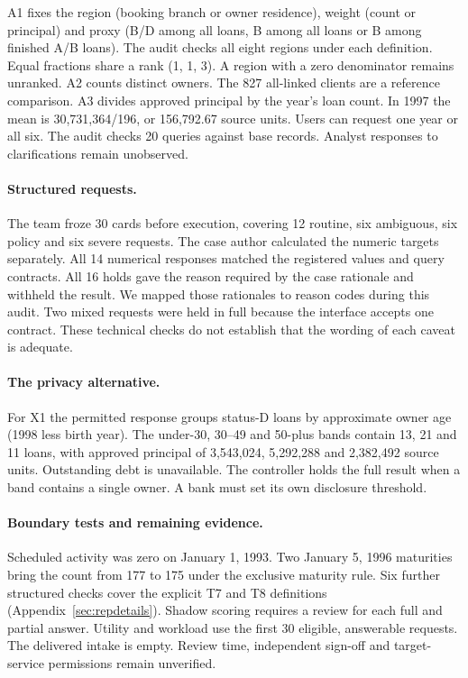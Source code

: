 A1 fixes the region (booking branch or owner residence), weight (count or principal) and proxy (B/D among all loans, B among all loans or B among finished A/B loans). The audit checks all eight regions under each definition. Equal fractions share a rank (1, 1, 3). A region with a zero denominator remains unranked. A2 counts distinct owners. The 827 all-linked clients are a reference comparison. A3 divides approved principal by the year's loan count. In 1997 the mean is 30,731,364/196, or 156,792.67 source units. Users can request one year or all six. The audit checks 20 queries against base records. Analyst responses to clarifications remain unobserved.

\paragraph{Structured requests.}
The team froze 30 cards before execution, covering 12 routine, six ambiguous, six policy and six severe requests. The case author calculated the numeric targets separately. All 14 numerical responses matched the registered values and query contracts. All 16 holds gave the reason required by the case rationale and withheld the result. We mapped those rationales to reason codes during this audit. Two mixed requests were held in full because the interface accepts one contract. These technical checks do not establish that the wording of each caveat is adequate.

\paragraph{The privacy alternative.}
For X1 the permitted response groups status-D loans by approximate owner age (1998 less birth year). The under-30, 30--49 and 50-plus bands contain 13, 21 and 11 loans, with approved principal of 3,543,024, 5,292,288 and 2,382,492 source units. Outstanding debt is unavailable. The controller holds the full result when a band contains a single owner. A bank must set its own disclosure threshold.

\paragraph{Boundary tests and remaining evidence.}
Scheduled activity was zero on January 1, 1993. Two January 5, 1996 maturities bring the count from 177 to 175 under the exclusive maturity rule. Six further structured checks cover the explicit T7 and T8 definitions (Appendix~\ref{sec:repdetails}). Shadow scoring requires a review for each full and partial answer. Utility and workload use the first 30 eligible, answerable requests. The delivered intake is empty. Review time, independent sign-off and target-service permissions remain unverified.
